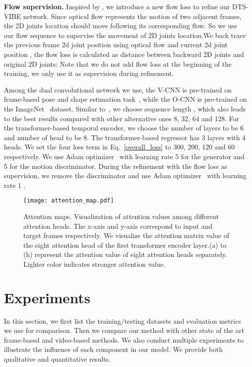 \documentclass[10pt,twocolumn,letterpaper]{article}
\begin{document}
{\bf Flow supervision.} Inspired by \cite{dong2018supervision}, we introduce a new flow loss to refine our DTS-VIBE network. Since optical flow represents the motion of two adjacent frames, the 2D joints location should move following its corresponding flow. So we use our flow sequence  to supervise the movement of 2D joints location.We back trace the previous frame 2d joint position  using optical flow  and current 2d joint position , the flow loss is calculated as  distance between backward 2D joints and original 2D joints:
Note that we do not add flow loss at the beginning of the training, we only use it as supervision during refinement.\par
Among the dual convolutional network we use, the V-CNN is pre-trained on frame-based pose and shape estimation task~\cite{kolotouros2019learning}, while the O-CNN is pre-trained on the ImageNet~\cite{russakovsky2015imagenet} dataset. Similar to~\cite{kocabas2020vibe}, we choose sequence length , which also leads to the best results compared with other alternative ones  8, 32, 64 and 128. For the transformer-based temporal encoder, we choose the number of layers to be 6 and number of head to be 8. The transformer-based regressor has 3 layers with 4 heads. We set the four loss term  in Eq.~\ref{overall_loss} to 300, 200, 120 and 60 respectively. We use Adam optimizer~\cite{kingma2014adam} with learning rate 5  for the generator and 5  for the motion discriminator. During the refinement with the flow loss  as supervision, we remove the discriminator and use Adam optimizer~\cite{kingma2014adam} with learning rate 1 .

\begin{figure*}[t]
\centering
\texttt{[image: attention\_map.pdf]}


\caption{Attention maps. Visualization of attention values among different attention heads. The x-axis and y-axis correspond to input and target frames respectively. We visualize the attention matrix value of the eight attention head of the first transformer encoder layer.(a) to (h) represent the attention value of eight attention heads separately. Lighter color indicates stronger attention value.}
\label{figure:attention_map}
\end{figure*}
\section{Experiments}
In this section, we first list the training/testing datasets and evaluation metrics we use for comparison. Then we compare our method with other state of the art frame-based and video-based methods. We also conduct multiple experiments to illustrate the influence of each component in our model. We provide both qualitative and quantitative results.
\end{document}
